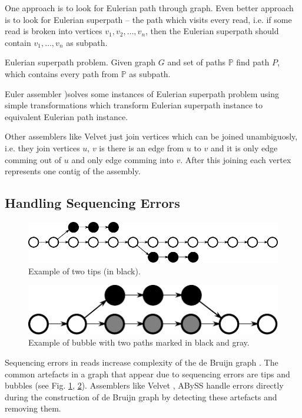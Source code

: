 One approach is to look for Eulerian path through graph.
Even better approach is to look for
Eulerian superpath -- the path which visits every read, i.e. if some read
is broken into vertices $v_1, v_2, \dots, v_n$, then the Eulerian superpath
should contain $v_1, \dots, v_n$ as subpath.

\begin{definition}{Eulerian superpath problem.}
Given graph $G$ and set of paths $\mathbb{P}$ find path $P$, which contains
every path from $\mathbb{P}$ as subpath.
\end{definition}

Euler assembler \citep{pevzner2001eulerian})solves some instances of Eulerian superpath problem
using simple transformations which transform Eulerian superpath instance to equivalent Eulerian path instance.

Other assemblers like Velvet \citep{Velvet} just join vertices which can be joined
unambiguosly, i.e. they join vertices $u$, $v$ is there is an edge from $u$ to $v$ and
it is only edge comming out of $u$ and only edge comming into $v$. After this joining
each vertex represents one contig of the assembly.

\subsection{Handling Sequencing Errors}

\begin{figure}
  \centerline{\includegraphics[scale=0.9]{../figures/tips.pdf}}
  \caption{Example of two tips (in black).}
  \label{fig:tips}
\end{figure}

\begin{figure}
  \centerline{\includegraphics[scale=0.9]{../figures/bubble.pdf}}
  \caption{Example of bubble with two paths marked in black and gray.}
  \label{fig:bubble}
\end{figure}

Sequencing errors in reads increase complexity of the de Bruijn graph
\citep{pevzner2001eulerian}. The common artefacts in a graph that
appear due to sequencing errors are tips and bubbles
(see Fig. \ref{fig:tips}, \ref{fig:bubble}). Assemblers like Velvet \citep{Velvet}, ABySS \citep{Abyss} handle
errors directly during the construction of de Bruijn graph by detecting these artefacts
and removing them.

